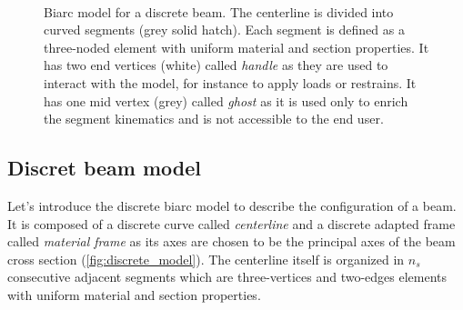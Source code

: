 \begin{figure}[p]
\begin{fullpage}
	\captionsetup[subfloat]{captionskip=20pt}
     	\centering
     	 \\
	\vspace{30pt}
	\vspace{20pt}
	\caption{Biarc model for a discrete beam. The centerline is divided into curved segments (grey solid hatch). Each segment is defined as a three-noded element with uniform material and section properties. It has two end vertices (white) called \emph{handle} as they are used to interact with the model, for instance to apply loads or restrains. It has one mid vertex (grey) called \emph{ghost} as it is used only to enrich the segment kinematics and is not accessible to the end user.}
\end{fullpage}
\end{figure}



\clearpage
\subsection{Discret beam model}



Let's introduce the discrete biarc model to describe the configuration of a beam. It is composed of a discrete curve called \emph{centerline} and a discrete adapted frame called \emph{material frame} as its axes are chosen to be the principal axes of the beam cross section (\cref{fig:discrete_model}). The centerline itself is organized in $n_s$ consecutive adjacent segments which are three-vertices and two-edges elements with uniform material and section properties.

